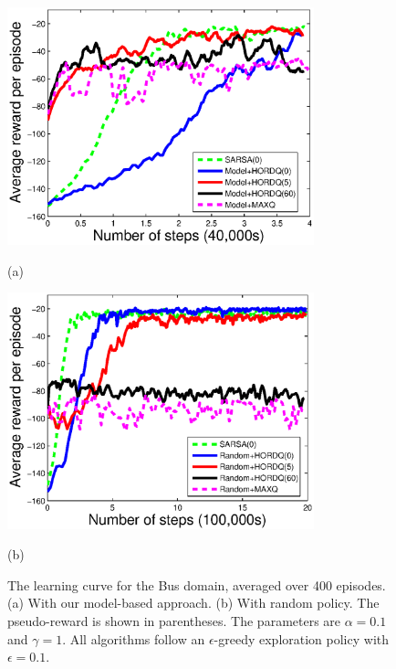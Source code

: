 \begin{figure}[b]
 \begin{minipage}[b]{0.9\linewidth}
     \begin{center}
    \includegraphics[width=3.5in] {./figures/Approx.eps}
\end{center}
\end{minipage}
\begin{minipage}[b]{0.9\linewidth} \centering (a) \end{minipage}
\begin{minipage}[b]{0.9\linewidth}
     \begin{center}
    \includegraphics[width=3.5in] {./figures/Random.eps}
\end{center}
\end{minipage}
\begin{minipage}[b]{0.9\linewidth} \centering (b) \end{minipage}
\caption{The learning curve for the Bus domain, averaged over 400 episodes. (a) With our model-based approach. (b) With random policy.
The pseudo-reward is shown in parentheses. The parameters are $\alpha=0.1$ and $\gamma=1$. All algorithms follow an $\epsilon$-greedy exploration policy
with $\epsilon = 0.1$.}
\label{fig:res}
\end{figure}


